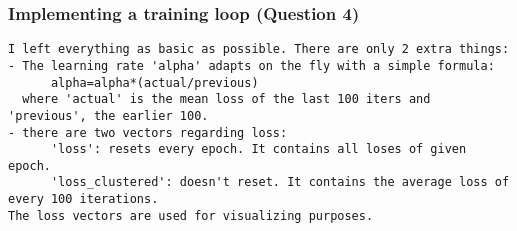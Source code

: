 \documentclass[11pt]{article}
\begin{document}
    \hypertarget{implementing-a-training-loop-question-4}{%
\subsubsection{Implementing a training loop (Question
4)}\label{implementing-a-training-loop-question-4}}

\begin{verbatim}
I left everything as basic as possible. There are only 2 extra things:
- The learning rate 'alpha' adapts on the fly with a simple formula: 
      alpha=alpha*(actual/previous) 
  where 'actual' is the mean loss of the last 100 iters and 'previous', the earlier 100.
- there are two vectors regarding loss: 
      'loss': resets every epoch. It contains all loses of given epoch.
      'loss_clustered': doesn't reset. It contains the average loss of every 100 iterations.    
The loss vectors are used for visualizing purposes. 
\end{verbatim}
\end{document}
